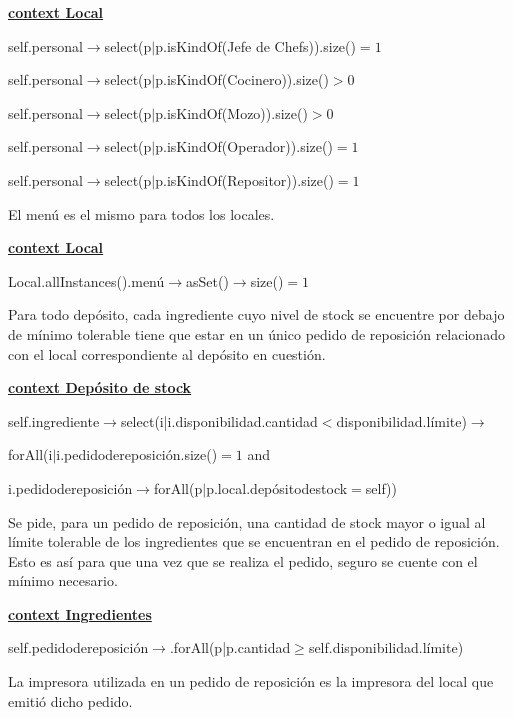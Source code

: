 \documentclass[a4paper,10pt]{article}
\begin{document}
\underline{\textbf{context Local}}

self.personal$\rightarrow$select(p$|$p.isKindOf(Jefe de Chefs)).size()$=1$

self.personal$\rightarrow$select(p$|$p.isKindOf(Cocinero)).size()$>0$

self.personal$\rightarrow$select(p$|$p.isKindOf(Mozo)).size()$>0$

self.personal$\rightarrow$select(p$|$p.isKindOf(Operador)).size()$=1$

self.personal$\rightarrow$select(p$|$p.isKindOf(Repositor)).size()$=1$

\bigskip

\noindent El men\'u es el mismo para todos los locales.

\medskip

\underline{\textbf{context Local}}

Local.allInstances().men\'u$\rightarrow$asSet()$\rightarrow$size()$=1$

\bigskip

\noindent Para todo dep\'osito, cada ingrediente cuyo nivel de stock se encuentre por debajo de mínimo tolerable tiene que estar en un \'unico pedido de reposición relacionado con el local correspondiente al dep\'osito en cuesti\'on.

\medskip

\underline{\textbf{context Depósito de stock}}

self.ingrediente$\rightarrow$select(i|i.disponibilidad.cantidad$<$disponibilidad.límite)$\rightarrow$

forAll(i$|$i.pedidodereposición.size()$=1$ and 

i.pedidodereposición$\rightarrow$forAll(p$|$p.local.depósitodestock$=$self))

\bigskip

\noindent Se pide, para un pedido de reposici\'on, una cantidad de stock mayor o igual al límite tolerable de los ingredientes que se encuentran en el pedido de reposición. 
Esto es as\'i para que una vez que se realiza el pedido, seguro se cuente con el m\'inimo necesario.

\medskip

\underline{\textbf{context Ingredientes}}

self.pedidodereposición$\rightarrow$.forAll(p|p.cantidad$\geq$self.disponibilidad.límite)

\bigskip

\noindent La impresora utilizada en un pedido de reposición es la impresora del local que emitió dicho pedido.
\end{document}
